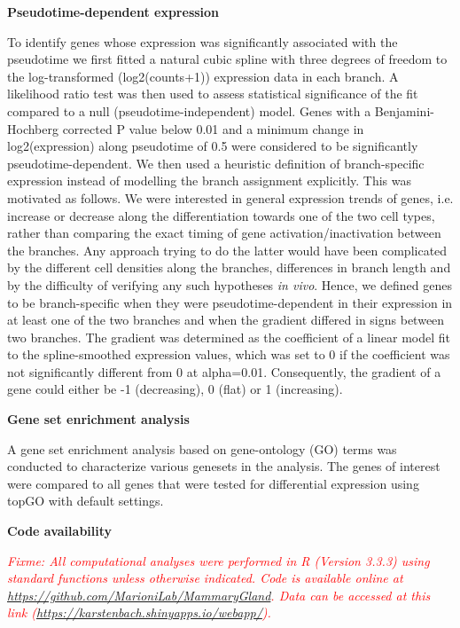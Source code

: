 \documentclass[titlepage, 12pt, oneside]{amsart}
\newcommand{\fixme}[1]{\textit{\textcolor{red}{Fixme: #1}}}
\begin{document}
\textbf{Pseudotime-dependent expression}

To identify genes whose expression was significantly associated with the pseudotime we first fitted a natural cubic spline with three degrees of freedom to the log-transformed (log2(counts+1)) expression data in each branch.
A likelihood ratio test was then used to assess statistical significance of the fit compared to a null (pseudotime-independent) model.
Genes with a Benjamini-Hochberg corrected P value below 0.01 and a minimum change in log2(expression) along pseudotime of 0.5 were considered to be significantly pseudotime-dependent.
We then used a heuristic definition of branch-specific expression instead of modelling the branch assignment explicitly.
This was motivated as follows.
We were interested in general expression trends of genes, i.e. increase or decrease along the differentiation towards one of the two cell types, rather than comparing the exact timing of gene activation/inactivation between the branches.
Any approach trying to do the latter would have been complicated by the different cell densities along the branches, differences in branch length and by the difficulty of verifying any such hypotheses \textit{in vivo}.
Hence, we defined genes to be branch-specific when they were pseudotime-dependent in their expression in at least one of the two branches and when the gradient differed in signs between two branches.
The gradient was determined as the coefficient of a linear model fit to the spline-smoothed expression values, which was set to 0 if the coefficient was not significantly different from 0 at alpha=0.01.
Consequently, the gradient of a gene could either be -1 (decreasing), 0 (flat) or 1 (increasing).

\textbf{Gene set enrichment analysis}

A gene set enrichment analysis based on gene-ontology (GO) terms was conducted to characterize various genesets in the analysis.
The genes of interest were compared to all genes that were tested for differential expression using topGO with default settings\autocite{Alexa2016}.

\textbf{Code availability}

\fixme{All computational analyses were performed in R (Version 3.3.3) using standard functions unless otherwise indicated.
Code is available online at \href{https://github.com/MarioniLab/MammaryGland}{\textit{https://github.com/MarioniLab/MammaryGland}}.
Data can be accessed at this link (\url{https://karstenbach.shinyapps.io/webapp/}).
}
\end{document}
